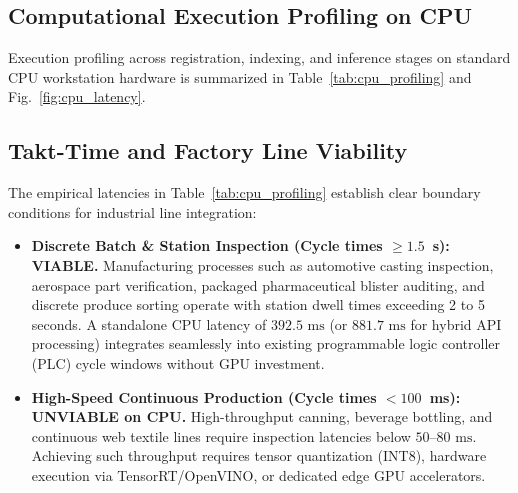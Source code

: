 \documentclass[journal]{IEEEtran}
\begin{document}
\subsection{Computational Execution Profiling on CPU}
Execution profiling across registration, indexing, and inference stages on standard CPU workstation hardware is summarized in Table~\ref{tab:cpu_profiling} and Fig.~\ref{fig:cpu_latency}.

\subsection{Takt-Time and Factory Line Viability}
The empirical latencies in Table~\ref{tab:cpu_profiling} establish clear boundary conditions for industrial line integration:
\begin{itemize}
    \item \textbf{Discrete Batch \& Station Inspection (Cycle times $\ge 1.5$~s):} \textbf{VIABLE.} Manufacturing processes such as automotive casting inspection, aerospace part verification, packaged pharmaceutical blister auditing, and discrete produce sorting operate with station dwell times exceeding 2 to 5 seconds. A standalone CPU latency of $392.5\text{ ms}$ (or $881.7\text{ ms}$ for hybrid API processing) integrates seamlessly into existing programmable logic controller (PLC) cycle windows without GPU investment.
    \item \textbf{High-Speed Continuous Production (Cycle times $< 100$~ms):} \textbf{UNVIABLE on CPU.} High-throughput canning, beverage bottling, and continuous web textile lines require inspection latencies below $50\text{--}80\text{ ms}$. Achieving such throughput requires tensor quantization (INT8), hardware execution via TensorRT/OpenVINO, or dedicated edge GPU accelerators.
\end{itemize}
\end{document}
